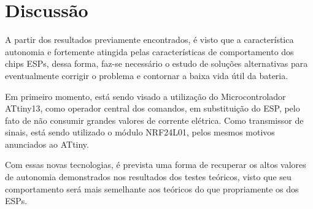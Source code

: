 \newpage
\section{Discussão}
\label{sc:discussao_}


{
A partir dos resultados previamente encontrados, é visto que a característica autonomia e fortemente atingida pelas características de comportamento dos chips ESPs, dessa forma, faz-se necessário o estudo de soluções alternativas para eventualmente corrigir o problema e contornar a baixa vida útil da bateria.
}

{
Em primeiro momento, está sendo visado a utilização do Microcontrolador ATtiny13, como operador central dos comandos, em substituição do ESP, pelo fato de não consumir grandes valores de corrente elétrica. Como transmissor de sinais, está sendo utilizado o módulo NRF24L01, pelos mesmos motivos anunciados ao ATtiny.
}

{
Com essas novas tecnologias, é prevista uma forma de recuperar os altos valores de autonomia demonstrados nos resultados dos testes teóricos, visto que seu comportamento será mais semelhante aos teóricos do que propriamente os dos ESPs.
}

